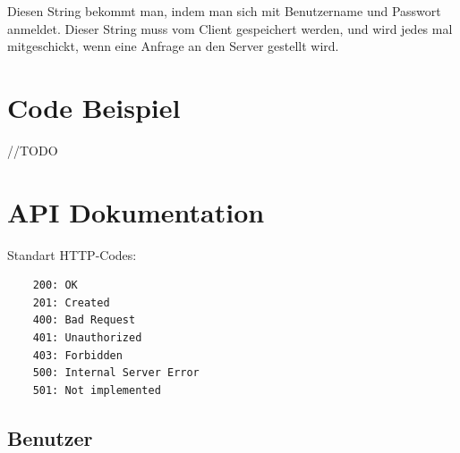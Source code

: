 \documentclass{article}
\begin{document}
Diesen String bekommt man, indem man sich mit Benutzername und Passwort anmeldet. Dieser String
muss vom Client gespeichert werden, und wird jedes mal mitgeschickt, wenn eine Anfrage an den Server 
gestellt wird.

\section{Code Beispiel}

//TODO

\section{API Dokumentation}

Standart HTTP-Codes:
\begin{verbatim}
    200: OK
    201: Created
    400: Bad Request
    401: Unauthorized
    403: Forbidden
    500: Internal Server Error
    501: Not implemented
\end{verbatim}

\subsection{Benutzer}
\end{document}
